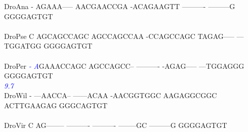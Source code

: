 \documentclass[11pt,twoside,reqno,a4paper]{article}
\begin{document}
{DroAna	-	AGAAA-----	AACGAACCGA	-ACAGAAGTT	----------	---------G	GGGGAGTGT\\
\hspace*{7\charwidth}\hspace*{1\charwidth}\hspace*{1\charwidth}\hspace*{1\charwidth}\hspace*{1\charwidth}\hspace*{1\charwidth}\hspace*{1\charwidth}\\
DroPse	C	AGCAGCCAGC	AGCCAGCCAA	-CCAGCCAGC	TAGAG-----	---TGGATGG	GGGGAGTGT\\
\hspace*{7\charwidth}\hspace*{1\charwidth}\hspace*{1\charwidth}\hspace*{1\charwidth}\hspace*{1\charwidth}\hspace*{1\charwidth}\hspace*{1\charwidth}\\
DroPer	\textit{\textcolor{Blue}{-}}	\textit{\textcolor{Blue}{A}}GAAACCAGC	AGCCAGCC--	----------	-AGAG-----	---TGGAGGG	GGGGAGTGT\\
\hspace*{7\charwidth}\hspace*{0\charwidth}\textit{\textcolor{Blue}{9.7}}\hspace*{1\charwidth}\hspace*{1\charwidth}\hspace*{1\charwidth}\hspace*{1\charwidth}\hspace*{1\charwidth}\hspace*{1\charwidth}\\
DroWil	-	---AACCA--	------ACAA	-AACGGTGGC	AAGAGGCGGC	ACTTGAAGAG	GGGCAGTGT\\
\hspace*{7\charwidth}\hspace*{1\charwidth}\hspace*{1\charwidth}\hspace*{1\charwidth}\hspace*{1\charwidth}\hspace*{1\charwidth}\hspace*{1\charwidth}\\
DroVir	C	AG--------	----------	----------	--------GC	---------G	GGGGAGTGT\\
}
\end{document}
